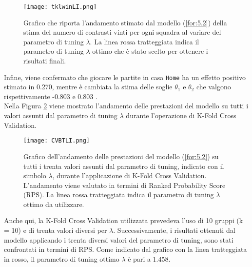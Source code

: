 \begin{figure}[htbp]
	\begin{center}
		\texttt{[image: tklwinLI.png]}
		\caption{Grafico che riporta l'andamento stimato dal modello (\ref{for:5.2}) della stima del numero di contrasti vinti per ogni squadra al variare del parametro di tuning $\lambda$. La linea rossa tratteggiata indica il parametro di tuning $\lambda$ ottimo che è stato scelto per ottenere i risultati finali.} \label{fig:tklwinLI}
	\end{center}
\end{figure}
Infine, viene confermato che giocare le partite in casa \texttt{Home} ha un effetto positivo stimato in 0.270, mentre è cambiata la stima delle soglie $\theta_1$ e $\theta_2$ che valgono rispettivamente -0.803  e 0.803 .\\
Nella Figura \ref{fig:lambda2} viene mostrato l'andamento delle prestazioni del modello su tutti i valori assunti dal parametro di tuning $\lambda$ durante l'operazione di K-Fold Cross Validation.
\begin{figure}[]
	\begin{center}
		\texttt{[image: CVBTLI.png]}
		\caption{Grafico dell'andamento delle prestazioni del modello (\ref{for:5.2}) su tutti i trenta valori assunti dal parametro di tuning, indicato con il simbolo $\lambda$, durante l'applicazione di K-Fold Cross Validation. L'andamento viene valutato in termini di Ranked Probability Score (RPS). La linea rossa tratteggiata indica il parametro di tuning $\lambda$ ottimo da utilizzare.} \label{fig:lambda2}
	\end{center}
\end{figure}
Anche qui, la K-Fold Cross Validation utilizzata prevedeva l'uso di 10 gruppi (k = 10) e di trenta valori diversi per $\lambda$. Successivamente, i risultati ottenuti dal modello applicando i trenta diversi valori del parametro di tuning, sono stati confrontati in termini di RPS. Come indicato dal grafico con la linea tratteggiata in rosso, il parametro di tuning ottimo $\lambda$ è pari a 1.458.\\

